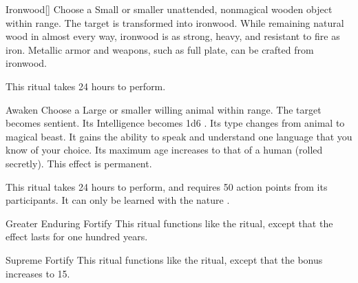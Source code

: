 \lowercase{\hypertarget{spell:Ironwood}{}}\label{spell:Ironwood}
\begin{ability}[\nth{3}]{\hypertarget{spell:Ironwood}{Ironwood}}[]
Choose a Small or smaller unattended, nonmagical wooden object within \rngclose range.
The target is transformed into ironwood.
While remaining natural wood in almost every way, ironwood is as strong, heavy, and resistant to fire as iron.
Metallic armor and weapons, such as full plate, can be crafted from ironwood.

This ritual takes 24 hours to perform.
\end{ability}
\vspace{0.25em}



\lowercase{\hypertarget{spell:Awaken}{}}\label{spell:Awaken}
\begin{ability}[\nth{5}]{\hypertarget{spell:Awaken}{Awaken}}
Choose a Large or smaller willing animal within \rngclose range.
The target becomes sentient.
Its Intelligence becomes 1d6 .
Its type changes from animal to magical beast.
It gains the ability to speak and understand one language that you know of your choice.
Its maximum age increases to that of a human (rolled secretly).
This effect is permanent.

This ritual takes 24 hours to perform, and requires 50 action points from its participants.
It can only be learned with the nature .
\end{ability}
\vspace{0.25em}



\lowercase{\hypertarget{spell:Greater Enduring Fortify}{}}\label{spell:Greater Enduring Fortify}
\begin{ability}[\nth{5}]{\hypertarget{spell:Greater Enduring Fortify}{Greater Enduring Fortify}}
This ritual functions like the  ritual, except that the effect lasts for one hundred years.
\end{ability}
\vspace{0.25em}



\lowercase{\hypertarget{spell:Supreme Fortify}{}}\label{spell:Supreme Fortify}
\begin{ability}[\nth{6}]{\hypertarget{spell:Supreme Fortify}{Supreme Fortify}}
This ritual functions like the  ritual, except that the  bonus increases to 15.
\end{ability}
\vspace{0.25em}


